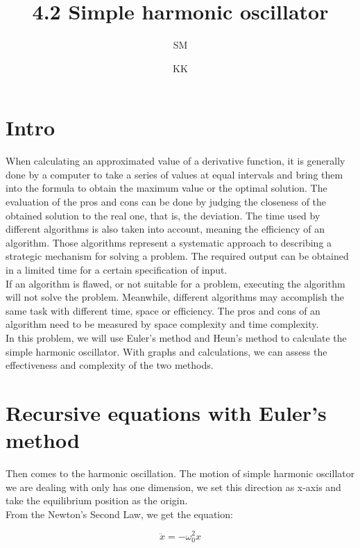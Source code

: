 \documentclass[12pt]{article}
\begin{document}
\title{4.2 Simple harmonic oscillator}
\author{SM \and KK}
\maketitle


\section{Intro}
When calculating an approximated value of a derivative function, it is generally done by a computer to take a series of values at equal intervals and bring them into the formula to obtain the maximum value or the optimal solution. The evaluation of the pros and cons can be done by judging the closeness of the obtained solution to the real one, that is, the deviation. The time used by different algorithms is also taken into account, meaning the efficiency of an algorithm. Those algorithms represent a systematic approach to describing a strategic mechanism for solving a problem. The required output can be obtained in a limited time for a certain specification of input.\\

If an algorithm is flawed, or not suitable for a problem, executing the algorithm will not solve the problem. Meanwhile, different algorithms may accomplish the same task with different time, space or efficiency. The pros and cons of an algorithm need to be measured by space complexity and time complexity.\\

In this problem, we will use Euler's method and Heun's method to calculate the simple harmonic oscillator. With graphs and calculations, we can assess the effectiveness and complexity of the two methods. 



\section{Recursive equations with Euler's method}
Then comes to the harmonic oscillation. The motion of simple harmonic oscillator we are dealing with only has one dimension, we set this direction as x-axis and take the equilibrium position as the origin. \\

From the Newton's Second Law, we get the equation: 

\begin{equation}
    \ddot{x} = -\omega_{0}^2 x
\end{equation} 
\end{document}
